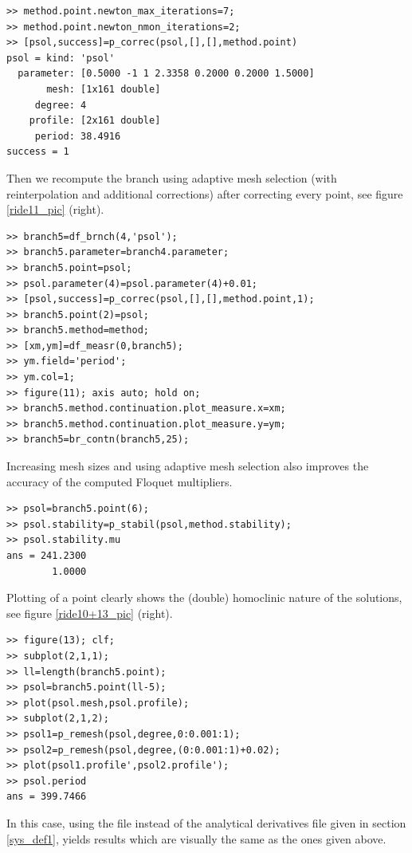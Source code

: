 \documentclass[10pt]{article}
\gdef \file#1{{\bfseries{\ttfamily{#1}}}}
\begin{document}
{{\begin{verbatim}
>> method.point.newton_max_iterations=7;
>> method.point.newton_nmon_iterations=2;
>> [psol,success]=p_correc(psol,[],[],method.point)
psol = kind: 'psol'
  parameter: [0.5000 -1 1 2.3358 0.2000 0.2000 1.5000]
       mesh: [1x161 double]
     degree: 4
    profile: [2x161 double]
     period: 38.4916
success = 1
\end{verbatim}}
Then we recompute the branch using adaptive mesh selection
(with reinterpolation and additional corrections) 
after correcting every point, see figure \ref{ride11_pic} (right).
{\small\begin{verbatim}
>> branch5=df_brnch(4,'psol');
>> branch5.parameter=branch4.parameter;
>> branch5.point=psol;
>> psol.parameter(4)=psol.parameter(4)+0.01;
>> [psol,success]=p_correc(psol,[],[],method.point,1);
>> branch5.point(2)=psol;
>> branch5.method=method;
>> [xm,ym]=df_measr(0,branch5);
>> ym.field='period';
>> ym.col=1;
>> figure(11); axis auto; hold on;
>> branch5.method.continuation.plot_measure.x=xm;
>> branch5.method.continuation.plot_measure.y=ym;
>> branch5=br_contn(branch5,25);
\end{verbatim}}
Increasing mesh sizes and using adaptive mesh selection
also improves the accuracy of the computed Floquet multipliers.
{\small\begin{verbatim}
>> psol=branch5.point(6);
>> psol.stability=p_stabil(psol,method.stability);
>> psol.stability.mu 
ans = 241.2300
        1.0000
\end{verbatim}}
Plotting of a point clearly shows the (double)
homoclinic nature of the solutions, see figure \ref{ride10+13_pic} (right).
{\small\begin{verbatim}
>> figure(13); clf;
>> subplot(2,1,1);
>> ll=length(branch5.point);
>> psol=branch5.point(ll-5);
>> plot(psol.mesh,psol.profile);
>> subplot(2,1,2);
>> psol1=p_remesh(psol,degree,0:0.001:1);
>> psol2=p_remesh(psol,degree,(0:0.001:1)+0.02);
>> plot(psol1.profile',psol2.profile');
>> psol.period
ans = 399.7466
\end{verbatim}}
In this case, using the file \file{df\_deriv.m} instead of the 
analytical derivatives file given in section \ref{sys_def1},
yields results which are visually the same as the ones given
above.

}
\end{document}
